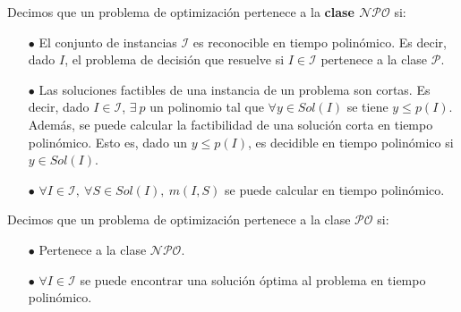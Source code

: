 \begin{definicion}
    Decimos que un problema de optimización pertenece a la \textbf{clase $\mathcal{NPO}$} si:
    \begin{itemize}
        \item[$\bullet$] El conjunto de instancias $\mathcal{I}$ es reconocible en tiempo polinómico. Es decir, dado $I$, el problema de decisión que resuelve si $I \in \mathcal{I}$ pertenece a la clase $\mathcal{P}$.
        \item[$\bullet$] Las soluciones factibles de una instancia de un problema son cortas. Es decir, dado $I \in \mathcal{I}$, $\exists \ p$ un polinomio tal que $\forall y \in Sol(I)$ se tiene $y \leq p(I)$. Además, se puede calcular la factibilidad de una solución corta en tiempo polinómico. Esto es, dado un $y \leq p(I)$, es decidible en tiempo polinómico si $y \in Sol(I)$.
        \item[$\bullet$] $\forall I \in \mathcal{I}, \ \forall S \in Sol(I), \ m(I,S)$ se puede calcular en tiempo polinómico.
    \end{itemize}
\end{definicion}

\begin{definicion}
    Decimos que un problema de optimización pertenece a la clase $\mathcal{PO}$ si:
    \begin{itemize}
        \item[$\bullet$] Pertenece a la clase $\mathcal{NPO}$.
        \item[$\bullet$] $\forall I \in \mathcal{I}$ se puede encontrar una solución óptima al problema en tiempo polinómico.
    \end{itemize}
\end{definicion}

